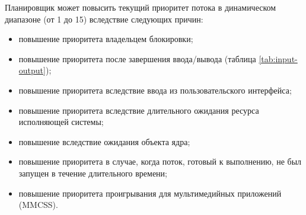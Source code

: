 \begin{table}[H]
	\begin{center}
		\caption{Соответствие между приоритетами Windows API и ядра Windows}
		\label{tab:prioritet}
	\end{center}
\end{table}

Планировщик может повысить текущий приоритет потока в динамическом диапазоне (от 1 до 15) вследствие следующих причин:
\begin{itemize}
	\item повышение приоритета владельцем блокировки;
	\item повышение приоритета после завершения ввода/вывода (таблица \ref{tab:input-output});
	\item повышение приоритета вследствие ввода из пользовательского интерфейса;
	\item повышение приоритета вследствие длительного ожидания ресурса исполняющей системы;
	\item повышение вследствие ожидания объекта ядра;
	\item повышение приоритета в случае, когда поток, готовый к выполнению, не был запущен в течение длительного времени;
	\item повышение приоритета проигрывания для мультимедийных приложений (MMCSS). 
\end{itemize}


